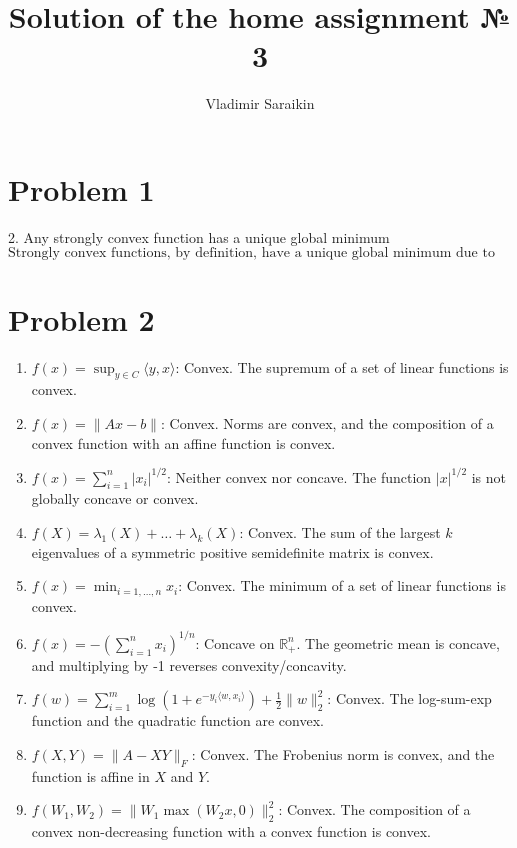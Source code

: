 \documentclass[12pt]{article}
\title{Solution of the home assignment  № 3}
\author{Vladimir Saraikin}
\date{}
\begin{document}
\maketitle

\section{Problem 1}

2. Any strongly convex function has a unique global minimum 
\[ \text{Strongly convex functions, by definition, have a unique global minimum due to the strictness of their convexity.} \]


\section{Problem 2}

\begin{enumerate}
    \item $ f(x) = \sup_{y \in C} \langle y, x \rangle $: Convex. The supremum of a set of linear functions is convex.
    \item $ f(x) = \| Ax - b \| $: Convex. Norms are convex, and the composition of a convex function with an affine function is convex.
    \item $ f(x) = \sum_{i=1}^{n} |x_i|^{1/2} $: Neither convex nor concave. The function \( |x|^{1/2} \) is not globally concave or convex.
    \item $ f(X) = \lambda_1(X) + \ldots + \lambda_k(X) $: Convex. The sum of the largest \( k \) eigenvalues of a symmetric positive semidefinite matrix is convex.
    \item $ f(x) = \min_{i=1,\ldots,n} x_i $: Convex. The minimum of a set of linear functions is convex.
    \item $ f(x) = - \left( \sum_{i=1}^{n} x_i \right)^{1/n} $: Concave on \( \mathbb{R}^n_+ \). The geometric mean is concave, and multiplying by -1 reverses convexity/concavity.
    \item $ f(w) = \sum_{i=1}^{m} \log(1 + e^{-y_i \langle w, x_i \rangle}) + \frac{1}{2} \| w \|_2^2 $: Convex. The log-sum-exp function and the quadratic function are convex.
    \item $ f(X, Y) = \| A - XY \|_F $: Convex. The Frobenius norm is convex, and the function is affine in \( X \) and \( Y \).
    \item $ f(W_1, W_2) = \| W_1 \max(W_2 x, 0) \|_2^2 $: Convex. The composition of a convex non-decreasing function with a convex function is convex.
\end{enumerate}
\end{document}
